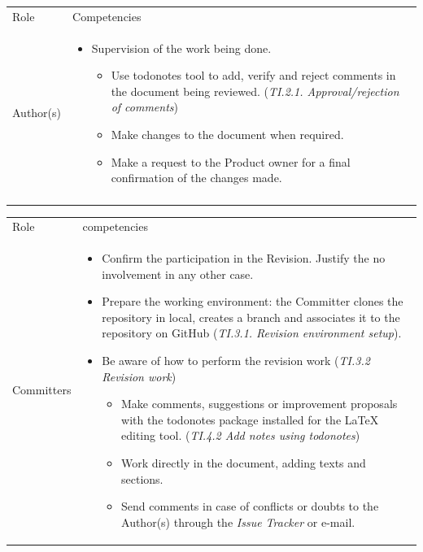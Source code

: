 \documentclass{template/openetcs_article}
\begin{document}
\begin{flushleft}
\begin{tabular}{|m{3cm}|m{11cm}|}
\hline
\rowcolor{myblue}
\multicolumn{2}{|c|}{Roles} \\\hline
\rowcolor{lightgray}
Role &
Competencies \\\hline
Author(s) & 
\begin{itemize}
\item Supervision of the work being done. 
\begin{itemize}
\item Use todonotes tool to add, verify and reject comments in the document being reviewed. ({\it TI.2.1. Approval/rejection of comments})
\item Make changes to the document when required.
\item Make a request to the Product owner for a final confirmation of the changes made. 
\end{itemize}
\end{itemize}
\\\\\hline
\end{tabular}
\end{flushleft}

\begin{flushleft}
\begin{tabular}{|m{3cm}|m{11cm}|}
\hline
\rowcolor{myblue}
\multicolumn{2}{|c|}{Roles} \\\hline
\rowcolor{lightgray}
Role &
competencies 
\\\hline
Committers &
\begin{itemize}
\item Confirm the participation in the Revision. Justify the no involvement in any other case.
\item Prepare the working environment: the Committer clones the repository in local, creates a branch and associates it to the repository on GitHub ({\it TI.3.1. Revision environment setup}).
\item Be aware of how to perform the revision work ({\it TI.3.2 Revision work})
\begin{itemize}
\item Make comments, suggestions or improvement proposals with the todonotes package installed for the LaTeX editing tool. ({\it TI.4.2 Add notes using todonotes})
\item Work directly in the document, adding texts and sections. 
\item Send comments in case of conflicts or doubts to the Author(s) through the {\it Issue Tracker} or e-mail.
\end{itemize}
\end{itemize}
\\\hline
\end{tabular}
\end{flushleft}
\end{document}
